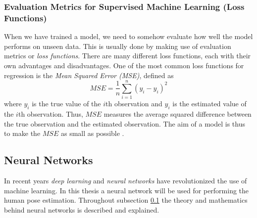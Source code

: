 \documentclass[main.tex]{subfiles}
\begin{document}
\subsubsection{Evaluation Metrics for Supervised Machine Learning (Loss Functions)}
When we have trained a model, we need to somehow evaluate how well the model performs on unseen data. This is usually done by making use of evaluation metrics or \textit{loss functions}. There are many different loss functions, each with their own advantages and disadvantages. One of the most common loss functions for regression is the \textit{Mean Squared Error (MSE)}, defined as
$$MSE = \frac{1}{n} \sum_{i = 1} ^n \left( y_i - \hat{y}_i \right)^2$$
where $y_i$ is the true value of the $i$th observation and $\hat{y}_i$ is the estimated value of the $i$th observation. Thus, $MSE$ measures the average squared difference between the true observation and the estimated observation. The aim of a model is thus to make the $MSE$ as small as possible \cite{ISL}.

\subsection{Neural Networks} \label{subsec:NeuralNetworks}
In recent years \textit{deep learning} and \textit{neural networks} have revolutionized the use of machine learning. In this thesis a neural network will be used for performing the human pose estimation. Throughout subsection \ref{subsec:NeuralNetworks} the theory and mathematics behind neural networks is described and explained.
\end{document}
